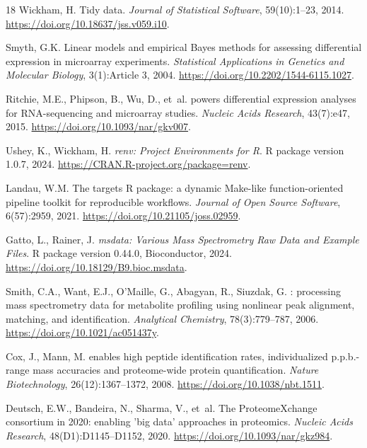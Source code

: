 \documentclass[11pt,twoside,openright]{book}
\begin{document}
\begin{thebibliography}{18}
Wickham, H.
\newblock Tidy data.
\newblock \emph{Journal of Statistical Software}, 59(10):1--23, 2014.
\newblock \url{https://doi.org/10.18637/jss.v059.i10}.

Smyth, G.K.
\newblock Linear models and empirical {Bayes} methods for assessing differential expression in microarray experiments.
\newblock \emph{Statistical Applications in Genetics and Molecular Biology}, 3(1):Article 3, 2004.
\newblock \url{https://doi.org/10.2202/1544-6115.1027}.

Ritchie, M.E., Phipson, B., Wu, D., et~al.
 powers differential expression analyses for {RNA}-sequencing and microarray studies.
\newblock \emph{Nucleic Acids Research}, 43(7):e47, 2015.
\newblock \url{https://doi.org/10.1093/nar/gkv007}.

Ushey, K., Wickham, H.
\newblock \emph{renv: Project Environments for R}.
\newblock R package version 1.0.7, 2024.
\newblock \url{https://CRAN.R-project.org/package=renv}.

Landau, W.M.
\newblock The targets {R} package: a dynamic Make-like function-oriented pipeline toolkit for reproducible workflows.
\newblock \emph{Journal of Open Source Software}, 6(57):2959, 2021.
\newblock \url{https://doi.org/10.21105/joss.02959}.

Gatto, L., Rainer, J.
\newblock \emph{msdata: Various Mass Spectrometry Raw Data and Example Files}.
\newblock R package version 0.44.0, Bioconductor, 2024.
\newblock \url{https://doi.org/10.18129/B9.bioc.msdata}.

Smith, C.A., Want, E.J., O'Maille, G., Abagyan, R., Siuzdak, G.
: processing mass spectrometry data for metabolite profiling using nonlinear peak alignment, matching, and identification.
\newblock \emph{Analytical Chemistry}, 78(3):779--787, 2006.
\newblock \url{https://doi.org/10.1021/ac051437y}.

Cox, J., Mann, M.
 enables high peptide identification rates, individualized p.p.b.-range mass accuracies and proteome-wide protein quantification.
\newblock \emph{Nature Biotechnology}, 26(12):1367--1372, 2008.
\newblock \url{https://doi.org/10.1038/nbt.1511}.

Deutsch, E.W., Bandeira, N., Sharma, V., et~al.
\newblock The {ProteomeXchange} consortium in 2020: enabling 'big data' approaches in proteomics.
\newblock \emph{Nucleic Acids Research}, 48(D1):D1145--D1152, 2020.
\newblock \url{https://doi.org/10.1093/nar/gkz984}.

\end{thebibliography}
\end{document}

